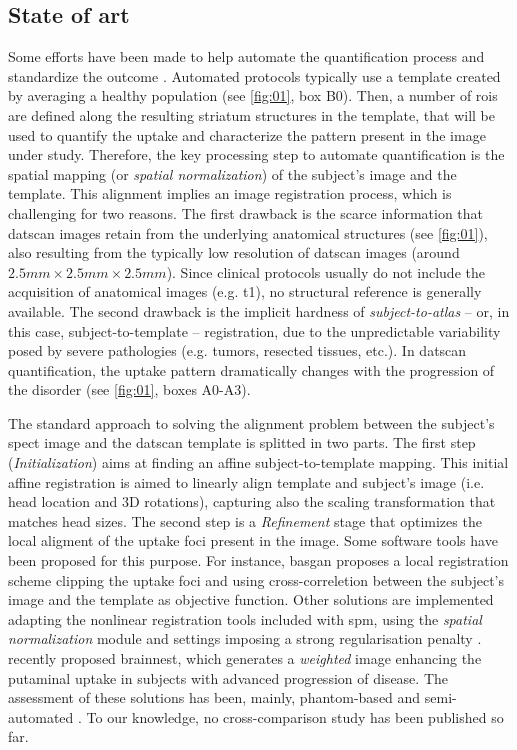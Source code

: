 \documentclass{frontiers}
\newcommand{\fixme}[1]{}
\newcommand{\fixme}[1]{{\color{red}{\bf FIXME: }\emph{#1}}}
\begin{document}
\subsection{State of art}\label{sec:state-of-art}
Some efforts have been made to help automate the quantification process 
  and standardize the outcome \citep{calvini_basal_2007,badiavas_spect_2011}.
Automated protocols typically use a template created by averaging a healthy
  population (see \autoref{fig:01}, box B0).
Then, a number of \glspl*{roi} are defined along the resulting striatum 
  structures in the template, that will be used to quantify the uptake and characterize the
  pattern present in the image under study.
Therefore, the key processing step to automate quantification is the
  spatial mapping (or \emph{spatial normalization}) of the subject's image and
  the template.
This alignment implies an image registration process, which is challenging for two reasons.
The first drawback is the scarce information that \gls*{datscan} images 
  retain from the underlying anatomical structures (see \autoref{fig:01}),
  also resulting from the typically low resolution of
  \gls*{datscan} images (around $2.5mm\times2.5mm\times2.5mm$).
Since clinical protocols usually do not include the acquisition of anatomical images
  (e.g. \gls*{t1}), no structural reference is generally available.
The second drawback is the implicit hardness of \emph{subject-to-atlas} 
   -- or, in this case, subject-to-template -- registration, due to the unpredictable 
  variability posed by severe pathologies (e.g. tumors, resected tissues, etc.).
In \gls*{datscan} quantification, the uptake pattern dramatically changes 
  with the progression of the disorder (see \autoref{fig:01}, boxes A0-A3).

The standard approach to solving the alignment problem between the subject's
  \gls*{spect} image and the \gls*{datscan} template is splitted in two parts.
The first step (\emph{Initialization}) aims at finding an affine subject-to-template mapping.
This initial affine registration is aimed to linearly align template and subject's
  image (i.e. head location and 3D rotations), capturing also the scaling 
  transformation that matches head sizes.
The second step is a \emph{Refinement} stage that optimizes the local aligment of
  the uptake foci present in the image.
Some software tools have been proposed for this purpose.
For instance, \gls*{basgan} \fixme{remove dead link} proposes a local registration scheme clipping the 
  uptake foci and using cross-correletion between the subject's image and 
  the template as objective function.
Other solutions are implemented adapting the nonlinear registration tools included
  with \gls*{spm}, using the \emph{spatial normalization} module and settings
  imposing a strong regularisation penalty \fixme{reference needed}.
\citeauthor{ciarmiello_weighted_2013} recently proposed \gls*{brainnest}, which
  generates a \emph{weighted} image enhancing the putaminal uptake in
  subjects with advanced progression of disease.
The assessment of these solutions has been, mainly, phantom-based
  and semi-automated \citep{skanjeti_assessing_2013}.
To our knowledge, no cross-comparison study has been published so far.
\end{document}
